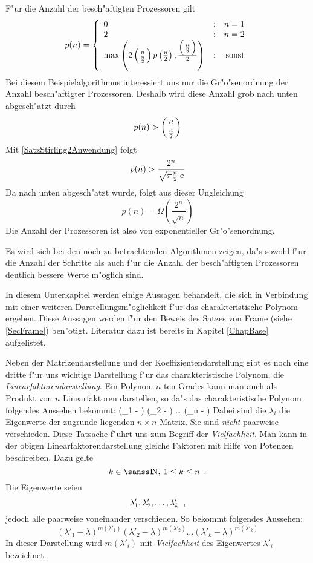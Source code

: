 F"ur die Anzahl der besch"aftigten Prozessoren gilt
\[ p(n) = \left\{
              \begin{array}{lcr}
                  0 & : & n = 1
              \\  2 & : & n = 2
              \\  \max\left(
                         2 \left( {  n  \atop  \frac{n}{2}  } \right)
                         p\left( \frac{n}{2} \right)
                      ,  \frac{ \left( {  \scriptstyle n  \atop  \frac{n}{2}  } \right) 
                              }{2}
                      \right)
                    & : & \mbox{sonst}
              \end{array}
          \right.
\]
Bei diesem Beispielalgorithmus interessiert uns nur die Gr"o"senordnung
der Anzahl besch"aftigter Prozessoren. Deshalb wird diese Anzahl grob
nach unten abgesch"atzt durch
\[ p(n) > \left( {  n  \atop  \frac{n}{2}  } \right) \]
Mit \ref{SatzStirling2Anwendung} folgt
\[ p(n) > \frac{ 2^n }{ \sqrt{\pi \frac{n}{2}} \: \mbox{\rm e} } \]
Da nach unten abgesch"atzt wurde, folgt aus dieser Ungleichung
\[ p(n) = \Omega\left( \frac{2^n}{\sqrt{n}} \right) \]
Die Anzahl der Prozessoren ist also von exponentieller Gr"o"senordnung.

Es wird sich bei den noch zu betrachtenden Algorithmen zeigen, da"s 
sowohl f"ur die Anzahl der Schritte als auch f"ur die
Anzahl der besch"aftigten Prozessoren deutlich bessere Werte m"oglich sind.



In diesem Unterkapitel werden einige Aussagen behandelt, die sich in
Verbindung mit einer weiteren Darstellungsm"oglichkeit f"ur das 
charakteristische Polynom ergeben. Diese Aussagen werden f"ur den 
Beweis des Satzes von Frame (siehe \ref{SecFrame}) ben"otigt. Literatur
dazu ist bereits in Kapitel \ref{ChapBase} aufgelistet.

Neben der Matrizendarstellung und der Koeffizientendarstellung gibt es 
noch eine dritte f"ur uns wichtige Darstellung f"ur das charakteristische
Polynom, die 
 {\em Linearfaktorendarstellung}. 
Ein Polynom $n$-ten Grades
kann man auch als Produkt von $n$ Linearfaktoren darstellen, so da"s das
charakteristische Polynom folgendes Aussehen bekommt:
    (\lambda_1 - \lambda) (\lambda_2 - \lambda) \ldots
    (\lambda_n - \lambda)
\Eeq
Dabei sind die $\lambda_i$ die Eigenwerte der zugrunde liegenden
$n \times n$-Matrix.
Sie sind {\em nicht} paarweise verschieden.
Diese Tatsache f"uhrt uns zum Begriff der
{\em Vielfachheit}. Man kann in der obigen Linearfaktorendarstellung
gleiche Faktoren mit Hilfe von Potenzen beschreiben. Dazu gelte
\[ k \in \Nat, \: 1 \leq k \leq n \MyPunkt \]
Die Eigenwerte seien
\[ \lambda'_1, \lambda'_2, \ldots, \lambda'_k \mbox{\hspace{0.5em},} \]
jedoch alle paarweise voneinander verschieden. So bekommt
 folgendes Aussehen:
\[ (\lambda'_1 - \lambda)^{m(\lambda'_1)}
   (\lambda'_2 - \lambda)^{m(\lambda'_2)} \ldots
   (\lambda'_k - \lambda)^{m(\lambda'_k)}
\]
In dieser Darstellung wird $m(\lambda'_i)$ mit {\em Vielfachheit} des
Eigenwertes $\lambda'_i$ bezeichnet.


